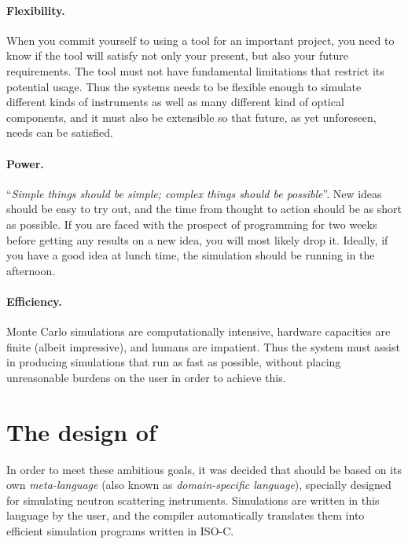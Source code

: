 \paragraph{Flexibility.}
When you commit yourself to using a tool for an important project, you
need to know if the tool will satisfy not only your present, but also
your future requirements. The tool must not have fundamental limitations that
restrict its potential usage. Thus the \MCS systems needs to be
flexible enough to simulate different kinds of instruments
as well as many different kind of
optical components, and it must also be extensible so that future, as
yet unforeseen, needs can be satisfied.
%
\paragraph{Power.}
``\textit{Simple things should be simple; complex things should be possible}''.
New ideas should be easy to try out, and the time from thought to action
should be as short as possible. If you are faced with the prospect of programming for
two weeks before getting any results on a new idea, you will most likely drop
it. Ideally, if you have a good idea at lunch time, the simulation
should be running in the afternoon.
%
\paragraph{Efficiency.}
Monte Carlo simulations are computationally intensive, hardware capacities
are finite (albeit impressive), and humans are impatient. Thus the
system must assist in producing simulations that run as fast as
possible, without placing unreasonable burdens on the user in order to
achieve this.


\section{The design of \MCS}
\label{s:design}

In order to meet these ambitious goals, it was decided that \MCS should
be based on its own \emph{meta-language} (also known as \emph{domain-specific language}), specially designed for
simulating neutron scattering instruments. Simulations are written in
this language by the user, and the \MCS compiler automatically
translates them into efficient simulation programs written in ISO-C.

